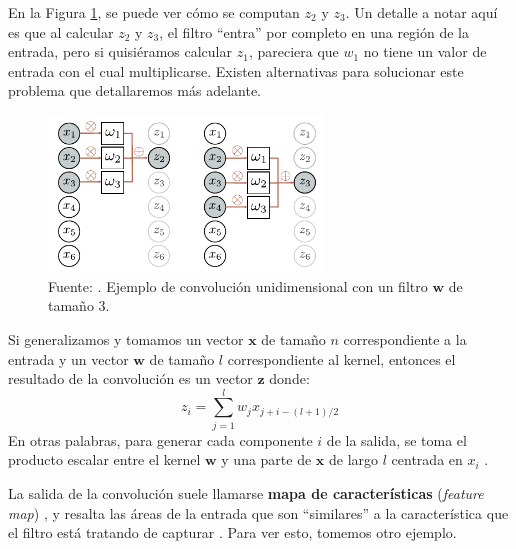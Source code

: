 \documentclass[../../main.tex]{subfiles}
\begin{document}
En la Figura \ref{fig:conv1d-example}, se puede ver cómo se computan \(z_2\) y \(z_3\). Un
detalle a notar aquí es que al calcular \(z_2\) y \(z_3\), el filtro ``entra'' por
completo en una región de la entrada, pero si quisiéramos calcular \(z_1\), pareciera que
\(w_1\) no tiene un valor de entrada con el cual multiplicarse. Existen alternativas para
solucionar este problema que detallaremos más adelante.

\begin{figure}
    \centering
    \includegraphics[width=0.65\textwidth]{figs/conv1d-example1.png}
    \caption{Fuente: \cite{prince2024understanding}. Ejemplo de convolución unidimensional
    con un filtro \(\bm{w}\) de tamaño 3.}
    \label{fig:conv1d-example}
\end{figure}

Si generalizamos y tomamos un vector \(\bm{x}\) de tamaño \(n\) correspondiente
a la entrada y un vector \(\bm{w}\) de tamaño \(l\) correspondiente al kernel,
entonces el resultado de la convolución es un vector \(\bm{z}\) donde:
\begin{equation}
    z_i = \sum_{j=1}^l w_j x_{j+i-(l+1)/2}
    \label{eq:convolution}
\end{equation}
En otras palabras, para generar cada componente \(i\) de la salida, se toma el producto
escalar entre el kernel \(\bm{w}\) y una parte de \(\bm{x}\) de largo \(l\) centrada en
\(x_i\) \cite{ai-a-modern-approach}.

La salida de la convolución suele llamarse \textbf{mapa de características}
(\textit{feature map}) \cite{deep-learning}, y resalta las áreas de la entrada que son
``similares'' a la característica que el filtro está tratando de capturar
\cite{hands-on-ML-sklearn-tf}. Para ver esto, tomemos otro ejemplo.
\end{document}
